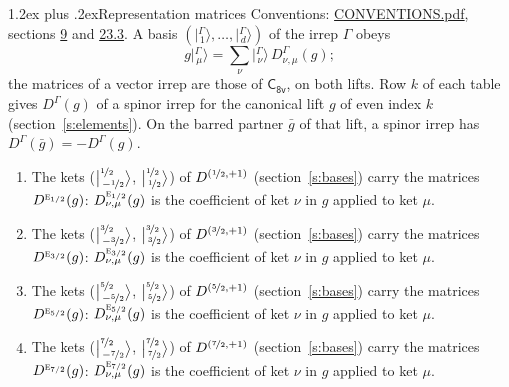 \documentclass[10pt,a4paper]{article}
\makeatletter
\renewcommand\section{\@startsection{section}{1}{\z@}{-3ex plus -1ex minus -.2ex}%
  {1.2ex plus .2ex}{\normalfont\large\sffamily\bfseries\color{parttitle}}}
\numberwithin{equation}{section}
\newcommand{\grp}[1]{\mathsf{#1}}
\newcommand{\irr}[1]{\text{\normalfont\scshape #1}}
\newcommand{\irrJp}[2]{D^{(#1,#2)}}
\newcommand{\repD}[1]{D^{#1}}
\newcommand{\intx}{\mu}
\newcommand{\jm}[2]{\bigl\lvert{}^{#1}_{\,#2}\bigr\rangle}
\newcommand{\irket}[2]{\bigl\lvert{}^{#1}_{\,#2}\bigr\rangle}
\newcommand{\barred}[1]{\bar{#1}}
\newenvironment{romanlist}{\begin{enumerate}%
\renewcommand{\labelenumi}{(\roman{enumi})}}%
  {\end{enumerate}}
\makeatother
\begin{document}
\section{Representation matrices}\label{s:irrep_matrices}
Conventions: \href{../../CONVENTIONS.pdf}{CONVENTIONS.pdf}, sections \href{../../../rotation/CONVENTIONS.pdf\#conv.9}{9} and \href{../../CONVENTIONS.pdf\#conv.23.3}{23.3}.
\leavevmode\label{n:vector.ket.partner}\label{n:index.partner}\label{n:matrix.irrep}\label{n:index.partner.summed}A basis $(\irket{\Gamma}{1}, \dots, \irket{\Gamma}{d})$ of the irrep $\Gamma$ obeys
\begin{equation}\label{e:partner}g\irket{\Gamma}{\intx} = \sum_\nu \irket{\Gamma}{\nu}\, \repD{\Gamma}_{\nu,\intx}(g);\end{equation}
the matrices of a vector irrep are those of \href{../../../rotation/data/pdf/C8v.pdf}{$\grp{C_{8v}}$}, on both lifts. Row $k$ of each table gives $\repD{\Gamma}(g)$ of a spinor irrep for the canonical lift $g$ of even index $k$ (section~\ref{s:elements}). On the barred partner $\barred{g}$ of that lift, a spinor irrep has $\repD{\Gamma}(\barred{g}) = -\repD{\Gamma}(g)$.
\begin{romanlist}\raggedright
\item The kets ($\jm{\nicefrac{1}{2}}{-\nicefrac{1}{2}}$, $\jm{\nicefrac{1}{2}}{\nicefrac{1}{2}}$) of $\irrJp{\nicefrac{1}{2}}{+1}$ (section~\ref{s:bases}) carry the matrices $\repD{\irr{e}_{1/2}}(g)$: $\repD{\irr{e}_{1/2}}_{\nu,\intx}(g)$ is the coefficient of ket $\nu$ in $g$ applied to ket $\intx$.
\item The kets ($\jm{\nicefrac{3}{2}}{-\nicefrac{3}{2}}$, $\jm{\nicefrac{3}{2}}{\nicefrac{3}{2}}$) of $\irrJp{\nicefrac{3}{2}}{+1}$ (section~\ref{s:bases}) carry the matrices $\repD{\irr{e}_{3/2}}(g)$: $\repD{\irr{e}_{3/2}}_{\nu,\intx}(g)$ is the coefficient of ket $\nu$ in $g$ applied to ket $\intx$.
\item The kets ($\jm{\nicefrac{5}{2}}{-\nicefrac{5}{2}}$, $\jm{\nicefrac{5}{2}}{\nicefrac{5}{2}}$) of $\irrJp{\nicefrac{5}{2}}{+1}$ (section~\ref{s:bases}) carry the matrices $\repD{\irr{e}_{5/2}}(g)$: $\repD{\irr{e}_{5/2}}_{\nu,\intx}(g)$ is the coefficient of ket $\nu$ in $g$ applied to ket $\intx$.
\item The kets ($\jm{\nicefrac{7}{2}}{-\nicefrac{7}{2}}$, $\jm{\nicefrac{7}{2}}{\nicefrac{7}{2}}$) of $\irrJp{\nicefrac{7}{2}}{+1}$ (section~\ref{s:bases}) carry the matrices $\repD{\irr{e}_{7/2}}(g)$: $\repD{\irr{e}_{7/2}}_{\nu,\intx}(g)$ is the coefficient of ket $\nu$ in $g$ applied to ket $\intx$.
\end{romanlist}
\end{document}
